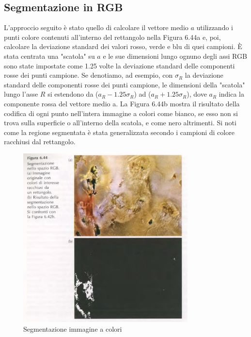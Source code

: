 \documentclass[12pt]{article}
\begin{document}
\subsection{Segmentazione in RGB}
L'approccio seguito è stato quello di calcolare il vettore medio $a$ utilizzando i punti colore contenuti all'interno del rettangolo nella Figura 6.44a e, poi, calcolare la deviazione standard dei valori rosso, verde e blu di quei campioni. È stata centrata una "scatola" su $a$ e le sue dimensioni lungo ognuno degli assi RGB sono state impostate come 1.25 volte la deviazione standard delle componenti rosse dei punti campione. Se denotiamo, ad esempio, con $\sigma_R$ la deviazione standard delle componenti rosse dei punti campione, le dimensioni della "scatola" lungo l'asse $R$ si estendono da ($a_R- 1.25\sigma_R$) ad ($a_R+ 1.25\sigma_R$), dove $a_R$ indica la componente rossa del vettore medio a. La Figura 6.44b mostra il risultato della codifica di ogni punto nell'intera immagine a colori come bianco, se esso non si trova sulla superficie o all'interno della scatola, e come nero altrimenti. Si noti come la regione segmentata è stata generalizzata secondo i campioni di colore racchiusi dal rettangolo.
\begin{figure}[!htb]
    \centering
    \includegraphics[width=0.8\textwidth]{Images/segcol.png}
    \caption{Segmentazione immagine a colori}
\end{figure}
\FloatBarrier
\end{document}
